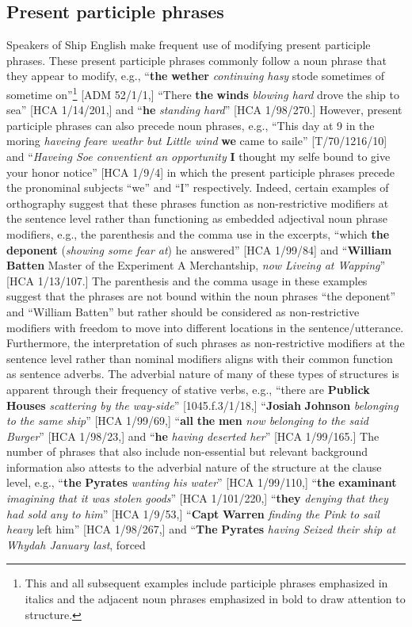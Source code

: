 \subsection{{Present} {participle} {phrases} }%

  Speakers of Ship English make frequent use of modifying present participle phrases. These present participle phrases commonly follow a noun phrase that they appear to modify, e.g., “\textbf{the} \textbf{wether} \textit{continuing hasy} stode sometimes of sometime on”\footnote{This and all subsequent examples include participle phrases emphasized in italics and the adjacent noun phrases emphasized in bold to draw attention to structure.} [ADM 52/1/1,] “There \textbf{the} \textbf{winds} \textit{blowing hard} drove the ship to sea” [HCA 1/14/201,] and “\textbf{he} \textit{standing hard}” [HCA 1/98/270.] However, present participle phrases can also precede noun phrases, e.g., “This day at 9 in the moring \textit{haveing feare weathr but Little wind} \textbf{we} came to saile” [T/70/1216/10] and “\textit{Haveing Soe conventient an opportunity} \textbf{I} thought my selfe bound to give your honor notice” [HCA 1/9/4] in which the present participle phrases precede the pronominal subjects “we” and “I” respectively. Indeed, certain examples of orthography suggest that these phrases function as non-restrictive modifiers at the sentence level rather than functioning as embedded adjectival noun phrase modifiers, e.g., the parenthesis and the comma use in the excerpts, “which \textbf{the} \textbf{deponent} (\textit{showing some fear at}) he answered” [HCA 1/99/84] and “\textbf{William} \textbf{Batten} Master of the Experiment A Merchantship, \textit{now Liveing at Wapping}” [HCA 1/13/107.] The parenthesis and the comma usage in these examples suggest that the phrases are not bound within the noun phrases “the deponent” and “William Batten” but rather should be considered as non-restrictive modifiers with freedom to move into different locations in the sentence/utterance. Furthermore, the interpretation of such phrases as non-restrictive modifiers at the sentence level rather than nominal modifiers aligns with their common function as sentence adverbs. The adverbial nature of many of these types of structures is apparent through their frequency of stative verbs, e.g., “there are \textbf{Publick} \textbf{Houses} \textit{scattering by the way-side}” [1045.f.3/1/18,] “\textbf{Josiah} \textbf{Johnson} \textit{belonging to the same ship}” [HCA 1/99/69,] “\textbf{all} \textbf{the} \textbf{men} \textit{now belonging to the said Burger}” [HCA 1/98/23,] and “\textbf{he} \textit{having deserted her}” [HCA 1/99/165.] The number of phrases that also include non-essential but relevant background information also attests to the adverbial nature of the structure at the clause level, e.g., “\textbf{the} \textbf{Pyrates} \textit{wanting his water}” [HCA 1/99/110,] “\textbf{the} \textbf{examinant} \textit{imagining that it was stolen goods}” [HCA 1/101/220,] “\textbf{they} \textit{denying that they had sold any to him}” [HCA 1/9/53,] “\textbf{Capt} \textbf{Warren} \textit{finding the Pink to sail heavy} left him” [HCA 1/98/267,] and “\textbf{The} \textbf{Pyrates} \textit{having Seized their ship at Whydah January last}, forced 
